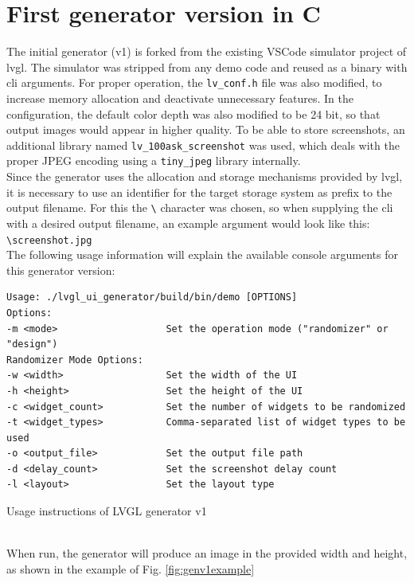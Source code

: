 \documentclass[Bachelor, BIC, english, fhCitStyle, IEEE]{BASE/twbook} %
\def\code#1{\texttt{#1}}
\begin{document}
\section{First generator version in C}
The initial generator (v1) is forked from the existing VSCode simulator project of \ac{lvgl}.\autocite{LvglLv_port_pc_vscode2024} The simulator was stripped from any demo code and reused as a binary with \ac{cli} arguments. For proper operation, the \code{lv\_conf.h} file was also modified, to increase memory allocation and deactivate unnecessary features. In the configuration, the default color depth was also modified to be 24 bit, so that output images would appear in higher quality. To be able to store screenshots, an additional library named \code{lv\_100ask\_screenshot} was used,\autocite{100askTeamLv_lib_100ask2024} which deals with the proper JPEG encoding using a \code{tiny\_jpeg} library internally.\\
Since the generator uses the allocation and storage mechanisms provided by \ac{lvgl}, it is necessary to use an identifier for the target storage system as prefix to the output filename. For this the \code{\textbackslash} character was chosen, so when supplying the \ac{cli} with a desired output filename, an example argument would look like this: \code{\textbackslash screenshot.jpg}\\
The following usage information will explain the available console arguments for this generator version:
\begin{listing}[htbp]
    \begin{verbatim}
Usage: ./lvgl_ui_generator/build/bin/demo [OPTIONS]
Options:
-m <mode>                   Set the operation mode ("randomizer" or "design")
Randomizer Mode Options:
-w <width>                  Set the width of the UI
-h <height>                 Set the height of the UI
-c <widget_count>           Set the number of widgets to be randomized
-t <widget_types>           Comma-separated list of widget types to be used
-o <output_file>            Set the output file path
-d <delay_count>            Set the screenshot delay count
-l <layout>                 Set the layout type
    \end{verbatim}
    \caption{Usage instructions of LVGL generator v1}
\end{listing}
\\
When run, the generator will produce an image in the provided width and height, as shown in the example of Fig. \ref{fig:genv1example}\\
\end{document}

